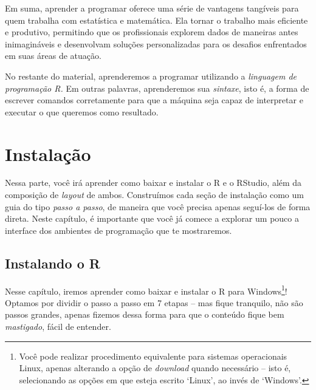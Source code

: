 \documentclass[
  letterpaper,
  DIV=11,
  numbers=noendperiod]{scrreprt}
\begin{document}
Em suma, aprender a programar oferece uma série de vantagens tangíveis
para quem trabalha com estatística e matemática. Ela tornar o trabalho
mais eficiente e produtivo, permitindo que os profissionais explorem
dados de maneiras antes inimagináveis e desenvolvam soluções
personalizadas para os desafios enfrentados em suas áreas de atuação.

No restante do material, aprenderemos a programar utilizando a
\emph{linguagem de programação R.} Em outras palavras, aprenderemos sua
\emph{sintaxe}, isto é, a forma de escrever comandos corretamente para
que a máquina seja capaz de interpretar e executar o que queremos como
resultado.

\part{Instalação}

Nessa parte, você irá aprender como baixar e instalar o R e o RStudio,
além da composição de \emph{layout} de ambos. Construímos cada seção de
instalação como um guia do tipo \emph{passo a passo}, de maneira que
você precisa apenas seguí-los de forma direta. Neste capítulo, é
importante que você já comece a explorar um pouco a interface dos
ambientes de programação que te mostraremos.

\chapter{Instalando o R}\label{instalando-o-r}

Nesse capítulo, iremos aprender como baixar e instalar o R para
Windows\footnote{Você pode realizar procedimento equivalente para
  sistemas operacionais Linux, apenas alterando a opção de
  \emph{download} quando necessário -- isto é, selecionando as opções em
  que esteja escrito `Linux', ao invés de `Windows'.}! Optamos por
dividir o passo a passo em 7 etapas -- mas fique tranquilo, não são
passos grandes, apenas fizemos dessa forma para que o conteúdo fique bem
\emph{mastigado}, fácil de entender.
\end{document}
